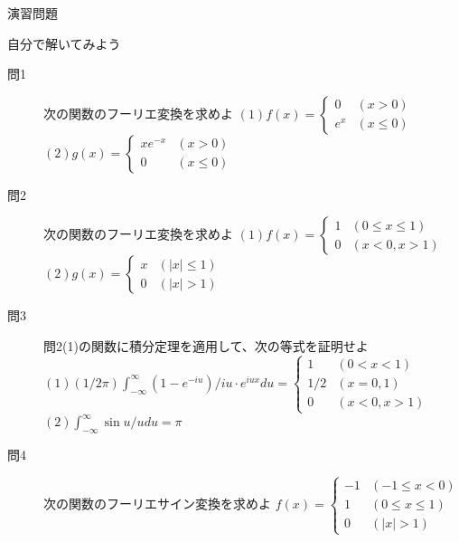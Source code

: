 \documentclass[professionalfonts]{beamer}
\begin{document}
\begin{frame}{演習問題}
  \begin{exampleblock}{自分で解いてみよう}
  \scriptsize
  \begin{description}
    \item[問1] 次の関数のフーリエ変換を求めよ
    $(1) f(x) = \begin{cases} 0 & (x > 0) \\ e^x & (x \leq 0) \end{cases}$\\
    $(2) g(x) = \begin{cases} xe^{-x} & (x > 0) \\ 0 & (x \leq 0) \end{cases}$\\
    \item[問2] 次の関数のフーリエ変換を求めよ
    $(1) f(x) = \begin{cases} 1 & (0 \leq x \leq 1) \\ 0 & (x < 0, x > 1) \end{cases}$\\
    $(2) g(x) = \begin{cases} x & (|x| \leq 1) \\ 0 & (|x| > 1) \end{cases}$\\
    \item[問3] 問2(1)の関数に積分定理を適用して、次の等式を証明せよ
    $(1) (1/2\pi)\int_{-\infty}^{\infty} (1-e^{-iu})/iu \cdot e^{iux} du = \begin{cases} 1 & (0<x<1) \\ 1/2 & (x=0,1) \\ 0 & (x<0, x>1) \end{cases}$\\
    $(2) \int_{-\infty}^{\infty} \sin u / u  du = \pi$\\
    \item[問4] 次の関数のフーリエサイン変換を求めよ
    $f(x) = \begin{cases} -1 & (-1 \leq x < 0) \\ 1 & (0 \leq x \leq 1) \\ 0 & (|x| > 1) \end{cases}$\\
  \end{description}
  \end{exampleblock}
\end{frame}
\end{document}
